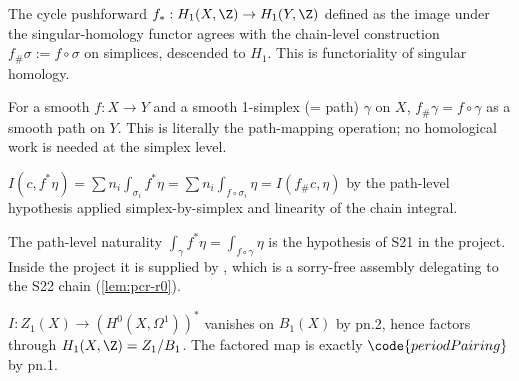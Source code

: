 \begin{lemma}[Pass pn.7: chain pushforward = singular homology functor]
\label{lem:pn-r7}
The cycle pushforward $f_{*}:H_{1}(X,\Z)\to H_{1}(Y,\Z)$ defined as the
image under the singular-homology functor agrees with the chain-level
construction $f_{\#}\sigma:=f\circ\sigma$ on simplices, descended to
$H_{1}$.  This is functoriality of singular homology.
\leanok
\end{lemma}

\begin{lemma}
\label{lem:pn-r8}
For a smooth $f:X\to Y$ and a smooth 1-simplex (= path) $\gamma$ on
$X$, $f_{\#}\gamma=f\circ\gamma$ as a smooth path on $Y$.  This is
literally the path-mapping operation; no homological work is needed at
the simplex level.
\leanok
\end{lemma}

\begin{lemma}
\label{lem:pn-r9}
$I(c,f^{*}\eta)=\sum n_{i}\int_{\sigma_{i}}f^{*}\eta=\sum
n_{i}\int_{f\circ\sigma_{i}}\eta=I(f_{\#}c,\eta)$ by the path-level
hypothesis applied simplex-by-simplex and linearity of the chain
integral.
\leanok
\end{lemma}

\begin{lemma}
\label{lem:pn-r10}
The path-level naturality $\int_{\gamma}f^{*}\eta=\int_{f\circ\gamma}\eta$
is the hypothesis  of S21 in the project.  Inside the
project it is supplied by ,
which is a sorry-free assembly delegating to the S22 chain
(\ref{lem:pcr-r0}).
\leanok
\end{lemma}

\begin{lemma}
\label{lem:pn-r11}
$I:Z_{1}(X)\to(H^{0}(X,\Omega^{1}))^{*}$ vanishes on $B_{1}(X)$ by
pn.2, hence factors through $H_{1}(X,\Z)=Z_{1}/B_{1}$. The factored
map is exactly $\code{periodPairing}$ by pn.1.
\leanok
\end{lemma}

